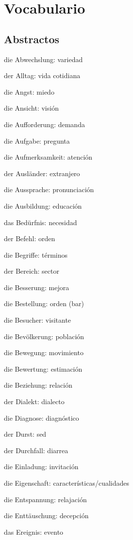 \chapter{Vocabulario}
\section{Abstractos}
\begin{multicols}{2}
\begin{myitemize}
\item die Abwechslung: variedad
\item der Alltag: vida cotidiana
\item die Angst: miedo
\item die Ansicht: visión
\item die Aufforderung: demanda
\item die Aufgabe: pregunta
\item die Aufmerksamkeit: atención
\item der Ausländer: extranjero
\item die Aussprache: pronunciación
\item die Ausbildung: educación
\item das Bedürfnis: necesidad
\item der Befehl: orden
\item die Begriffe: términos
\item der Bereich: sector
\item die Besserung: mejora
\item die Bestellung: orden (bar)
\item die Besucher: visitante
\item die Bevölkerung: población
\item die Bewegung: movimiento
\item die Bewertung: estimación
\item die Beziehung: relación
\item der Dialekt: dialecto
\item die Diagnose: diagnóstico
\item der Durst: sed
\item der Durchfall: diarrea
\item die Einladung: invitación
\item die Eigenschaft: características/cualidades
\item die Entspannung: relajación
\item die Enttäuschung: decepción
\item das Ereignis: evento

\end{myitemize}
\end{multicols}
